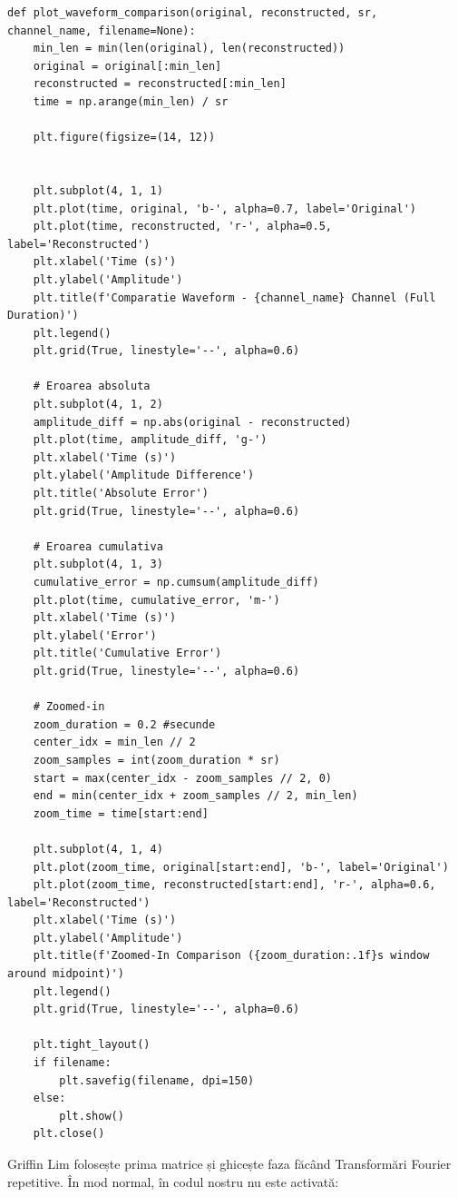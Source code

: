 \documentclass[12pt]{article}
\begin{document}
\begin{lstlisting}
def plot_waveform_comparison(original, reconstructed, sr, channel_name, filename=None):
    min_len = min(len(original), len(reconstructed))
    original = original[:min_len]
    reconstructed = reconstructed[:min_len]
    time = np.arange(min_len) / sr

    plt.figure(figsize=(14, 12))

    
    plt.subplot(4, 1, 1)
    plt.plot(time, original, 'b-', alpha=0.7, label='Original')
    plt.plot(time, reconstructed, 'r-', alpha=0.5, label='Reconstructed')
    plt.xlabel('Time (s)')
    plt.ylabel('Amplitude')
    plt.title(f'Comparatie Waveform - {channel_name} Channel (Full Duration)')
    plt.legend()
    plt.grid(True, linestyle='--', alpha=0.6)

    # Eroarea absoluta
    plt.subplot(4, 1, 2)
    amplitude_diff = np.abs(original - reconstructed)
    plt.plot(time, amplitude_diff, 'g-')
    plt.xlabel('Time (s)')
    plt.ylabel('Amplitude Difference')
    plt.title('Absolute Error')
    plt.grid(True, linestyle='--', alpha=0.6)

    # Eroarea cumulativa
    plt.subplot(4, 1, 3)
    cumulative_error = np.cumsum(amplitude_diff)
    plt.plot(time, cumulative_error, 'm-')
    plt.xlabel('Time (s)')
    plt.ylabel('Error')
    plt.title('Cumulative Error')
    plt.grid(True, linestyle='--', alpha=0.6)

    # Zoomed-in
    zoom_duration = 0.2 #secunde
    center_idx = min_len // 2
    zoom_samples = int(zoom_duration * sr)
    start = max(center_idx - zoom_samples // 2, 0)
    end = min(center_idx + zoom_samples // 2, min_len)
    zoom_time = time[start:end]

    plt.subplot(4, 1, 4)
    plt.plot(zoom_time, original[start:end], 'b-', label='Original')
    plt.plot(zoom_time, reconstructed[start:end], 'r-', alpha=0.6, label='Reconstructed')
    plt.xlabel('Time (s)')
    plt.ylabel('Amplitude')
    plt.title(f'Zoomed-In Comparison ({zoom_duration:.1f}s window around midpoint)')
    plt.legend()
    plt.grid(True, linestyle='--', alpha=0.6)

    plt.tight_layout()
    if filename:
        plt.savefig(filename, dpi=150)
    else:
        plt.show()
    plt.close()
\end{lstlisting}

Griffin Lim folosește prima matrice și ghicește faza făcând Transformări Fourier repetitive. În mod normal, în codul nostru nu este activată:
\end{document}

